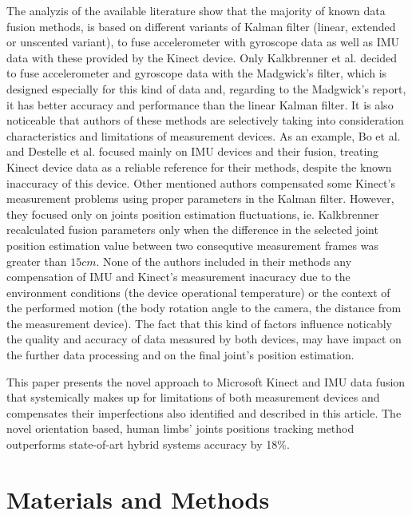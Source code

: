 \documentclass[sensors,article,submit,moreauthors,pdftex,10pt,a4paper]{mdpi}
\begin{document}
The analyzis of the available literature show that the majority of known data fusion methods, is based on different variants of Kalman filter (linear, extended or unscented variant), to fuse accelerometer with gyroscope data as well as IMU data with these provided by the Kinect device. Only Kalkbrenner et al. decided to fuse accelerometer and gyroscope data with the Madgwick's filter, which is designed especially for this kind of data and, regarding to the Madgwick's report\cite{Madgwick2011}, it has better accuracy and performance than the linear Kalman filter. It is also noticeable that authors of these methods are selectively taking into consideration characteristics and limitations of measurement devices. As an example, Bo et al. \cite{Bo2011a} and Destelle et al. \cite{Destelle2014} focused mainly on IMU devices and their fusion, treating Kinect device data as a reliable reference for their methods, despite the known inaccuracy of this device. Other mentioned authors compensated some Kinect's measurement problems using proper parameters in the Kalman filter. However, they focused only on joints position estimation fluctuations, ie. Kalkbrenner recalculated fusion parameters only when the difference in the selected joint position estimation value between two consequtive measurement frames was greater than $15cm$. None of the authors included in their methods any compensation of IMU and Kinect's measurement inacuracy due to the environment conditions (the device operational temperature) or the context of the performed motion (the body rotation angle to the camera, the distance from the measurement device). The fact that this kind of factors influence noticably the quality and accuracy of data measured by both devices, may have impact on the further data processing and on the final joint's position estimation.

This paper presents the novel approach to Microsoft Kinect and IMU data fusion that systemically makes up for limitations of both measurement devices and compensates their imperfections also identified and described in this article. The novel orientation based, human limbs’ joints positions tracking method outperforms state-of-art hybrid systems accuracy by 18\%.

\section{Materials and Methods}

\end{document}
